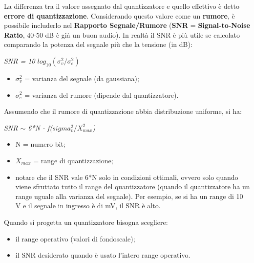 \documentclass{article}
\begin{document}
				La differenza tra il valore assegnato dal quantizzatore e quello effettivo è detto \textbf{errore di quantizzazione}. Considerando questo valore come un \textbf{rumore}, è possibile includerlo nel \textbf{Rapporto Segnale/Rumore} (\textbf{SNR} = \textbf{Signal-to-Noise Ratio}, 40-50 dB è già un buon audio). In realtà il SNR è più utile se calcolato comparando la potenza del segnale più che la tensione (in dB):
				\begin{center}
					\textit{SNR = 10 $log_{10}(\sigma^{2}_{v}/\sigma^{2}_{e})$}
				\end{center}
				\begin{itemize}
					\item $\sigma^{2}_{v}$ = varianza del segnale (da gaussiana);
					\item $\sigma^{2}_{e}$ = varianza del rumore (dipende dal quantizzatore).
				\end{itemize}
				Assumendo che il rumore di quantizzazione abbia distribuzione uniforme, si ha:
				\begin{center}
					\textit{SNR $\sim$ 6*N - f($sigma^{2}_{v}/X^{2}_{max}$)}
				\end{center}
				\begin{itemize}
					\item N = numero bit;
					\item $X_{max}$ = range di quantizzazione;
					\item notare che il SNR vale 6*N solo in condizioni ottimali, ovvero solo quando viene sfruttato tutto il range del quantizzatore (quando il quantizzatore ha un range uguale alla varianza del segnale). Per esempio, se si ha un range di 10 V e il segnale in ingresso è di mV, il SNR è alto.
				\end{itemize}
				Quando si progetta un quantizzatore bisogna scegliere:
				\begin{itemize}
					\item il range operativo (valori di fondoscale);
					\item il SNR desiderato quando è usato l'intero range operativo.
				\end{itemize}

				
\end{document}
